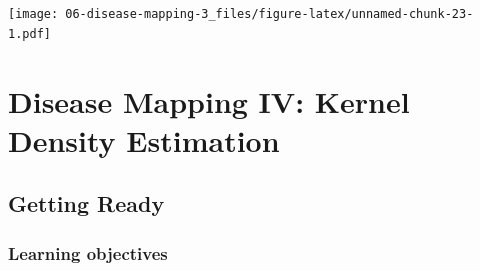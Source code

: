 \documentclass[
]{book}
\begin{document}
\texttt{[image: 06-disease-mapping-3\_files/figure-latex/unnamed-chunk-23-1.pdf]}

\hypertarget{disease-mapping-iv-kernel-density-estimation}{%
\chapter{Disease Mapping IV: Kernel Density Estimation}\label{disease-mapping-iv-kernel-density-estimation}}

\hypertarget{getting-ready-5}{%
\section{Getting Ready}\label{getting-ready-5}}

\hypertarget{learning-objectives-6}{%
\subsection{Learning objectives}\label{learning-objectives-6}}

 
  \providecommand{\huxb}[2]{\arrayrulecolor[RGB]{#1}\global\arrayrulewidth=#2pt}
  \providecommand{\huxvb}[2]{\color[RGB]{#1}\vrule width #2pt}
  \providecommand{\huxtpad}[1]{\rule{0pt}{#1}}
  \providecommand{\huxbpad}[1]{\rule[-#1]{0pt}{#1}}
\end{document}
